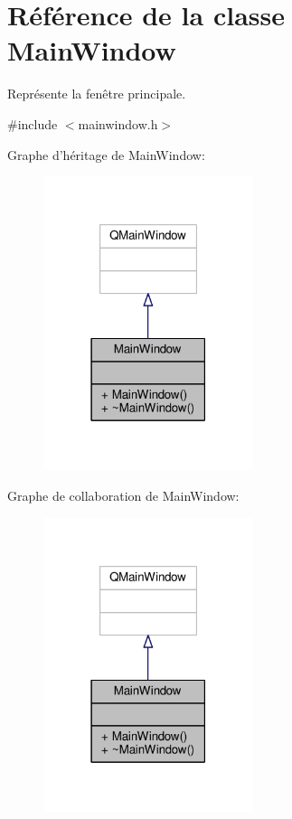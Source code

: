 \hypertarget{classMainWindow}{\section{Référence de la classe Main\+Window}
\label{classMainWindow}
}


Représente la fenêtre principale.  




{\ttfamily \#include $<$mainwindow.\+h$>$}



Graphe d'héritage de Main\+Window\+:\nopagebreak
\begin{figure}[H]
\begin{center}
\leavevmode
\includegraphics[width=174pt]{d1/d96/classMainWindow__inherit__graph}
\end{center}
\end{figure}


Graphe de collaboration de Main\+Window\+:\nopagebreak
\begin{figure}[H]
\begin{center}
\leavevmode
\includegraphics[width=174pt]{d2/d38/classMainWindow__coll__graph}
\end{center}
\end{figure}
